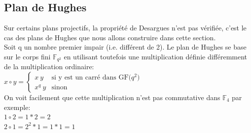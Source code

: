 \documentclass[a4paper]{article}
\begin{document}
\subsection{Plan de Hughes}
Sur certains plans projectifs, la propriété de Desargues n'est pas vérifiée, c'est le cas des plans de Hughes que nous allons construire dans cette section.\medskip\\

Soit q un nombre premier impair (i.e. différent de 2).
Le plan de Hughes se base sur le corps fini $\mathbb{F}_{q^2}$ en utilisant toutefois une multiplication définie différemment de la multiplication ordinaire:\\


$x \circ y =
        \begin{cases}
        x\ y & \text{si y est un carré dans GF($q^2$)}\\
        x^q\ y & \text{sinon}
        \end{cases}
        $
        \smallskip\\
On voit facilement que cette multiplication n'est pas commutative dans $\mathbb{F}_4$ par exemple:\\
$1 \circ 2 = 1*2 = 2$\\
$2 \circ 1 = 2^2*1 = 1*1 =1$
        
\end{document}
